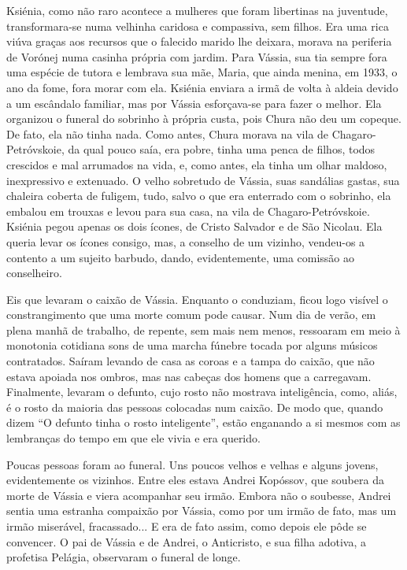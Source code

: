 Ksiénia, como não raro acontece a mulheres que foram libertinas na
juventude, transformara-se numa velhinha caridosa e compassiva, sem
filhos. Era uma rica viúva graças aos recursos que o falecido marido lhe
deixara, morava na periferia de Vorónej numa casinha própria com jardim.
Para Vássia, sua tia sempre fora uma espécie de tutora e lembrava sua
mãe, Maria, que ainda menina, em 1933, o ano da fome, fora morar com
ela. Ksiénia enviara a irmã de volta à aldeia devido a um escândalo
familiar, mas por Vássia esforçava-se para fazer o melhor. Ela organizou
o funeral do sobrinho à própria custa, pois Chura não deu um copeque. De
fato, ela não tinha nada. Como antes, Chura morava na vila de
Chagaro-Petróvskoie, da qual pouco saía, era pobre, tinha uma penca de
filhos, todos crescidos e mal arrumados na vida, e, como antes, ela
tinha um olhar maldoso, inexpressivo e extenuado. O velho sobretudo de
Vássia, suas sandálias gastas, sua chaleira coberta de fuligem, tudo,
salvo o que era enterrado com o sobrinho, ela embalou em trouxas e levou
para sua casa, na vila de Chagaro-Petróvskoie. Ksiénia pegou apenas os
dois ícones, de Cristo Salvador e de São Nicolau. Ela queria levar os
ícones consigo, mas, a conselho de um vizinho, vendeu-os a contento a um
sujeito barbudo, dando, evidentemente, uma comissão ao conselheiro.

Eis que levaram o caixão de Vássia. Enquanto o conduziam, ficou logo
visível o constrangimento que uma morte comum pode causar. Num dia de
verão, em plena manhã de trabalho, de repente, sem mais nem menos,
ressoaram em meio à monotonia cotidiana sons de uma marcha fúnebre
tocada por alguns músicos contratados. Saíram levando de casa as coroas
e a tampa do caixão, que não estava apoiada nos ombros, mas nas cabeças
dos homens que a carregavam. Finalmente, levaram o defunto, cujo rosto
não mostrava inteligência, como, aliás, é o rosto da maioria das pessoas
colocadas num caixão. De modo que, quando dizem ``O defunto tinha o
rosto inteligente'', estão enganando a si mesmos com as lembranças do
tempo em que ele vivia e era querido.

Poucas pessoas foram ao funeral. Uns poucos velhos e velhas e alguns
jovens, evidentemente os vizinhos. Entre eles estava Andrei Kopóssov,
que soubera da morte de Vássia e viera acompanhar seu irmão. Embora não
o soubesse, Andrei sentia uma estranha compaixão por Vássia, como por um
irmão de fato, mas um irmão miserável, fracassado... E era de fato
assim, como depois ele pôde se convencer. O pai de Vássia e de Andrei, o
Anticristo, e sua filha adotiva, a profetisa Pelágia, observaram o
funeral de longe.

